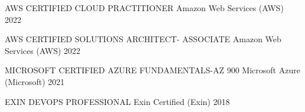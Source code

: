 

\begin{cvhonors}

  \cvhonor
    {AWS CERTIFIED CLOUD PRACTITIONER} %
    {Amazon Web Services (AWS)} %
    {} %
    {2022} %

  \cvhonor
    {AWS CERTIFIED SOLUTIONS ARCHITECT- ASSOCIATE} %
    {Amazon Web Services (AWS)} %
    {} %
    {2022} %

  \cvhonor
    {MICROSOFT CERTIFIED AZURE FUNDAMENTALS-AZ 900} %
    {Microsoft Azure (Microsoft)} %
    {} %
    {2021} %

  \cvhonor
    {EXIN DEVOPS PROFESSIONAL} %
    {Exin Certified (Exin)} %
    {} %
    {2018} %


\end{cvhonors}
